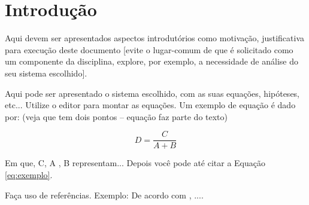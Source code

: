 \section{Introdução}

Aqui devem ser apresentados aspectos introdutórios como motivação, justificativa para execução deste documento [evite o lugar-comum de que é solicitado como um componente da disciplina, explore, por exemplo, a necessidade de análise do seu sistema escolhido].

Aqui pode ser apresentado o sistema escolhido, com as suas equações, hipóteses, etc...
Utilize o editor para montar as equações.
Um exemplo de equação é dado por: (veja que tem dois pontos – equação faz parte do texto)

\begin{equation}
  D = \frac{C}{A + B}
  \label{eq:exemplo}
\end{equation}

Em que, C, A , B representam... Depois você pode até citar a Equação \ref{eq:exemplo}.

Faça uso de referências. Exemplo: De acordo com \textcite{santana_2017}, ....
